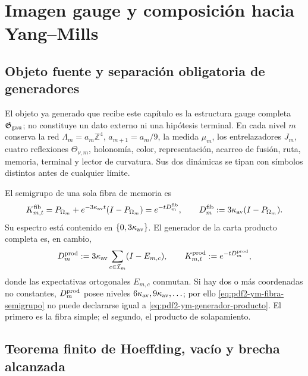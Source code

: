 \chapter{Imagen gauge y composición hacia Yang--Mills}

\section{Objeto fuente y separación obligatoria de generadores}

El objeto ya generado que recibe este capítulo es la estructura gauge completa
$\mathfrak G_{\rm gau}$; no constituye un dato externo ni una hipótesis terminal.
En cada nivel $m$ conserva la red
$\Lambda_m=a_m\mathbb Z^4$, $a_{m+1}=a_m/9$, la medida $\mu_m$, los
entrelazadores $J_m$, cuatro reflexiones $\Theta_{\nu,m}$, holonomía, color,
representación, acarreo de fusión, ruta, memoria, terminal y lector de curvatura.
Sus dos dinámicas se tipan con símbolos distintos antes de cualquier límite.

El semigrupo de una sola fibra de memoria es
\begin{equation}\label{eq:pdf2-ym-fibra-semigrupo}
 K^{\rm fib}_{m,t}
 =P_{\Omega_m}+e^{-3\kappa_{\rm av}t}(I-P_{\Omega_m})
 =e^{-tD_m^{\rm fib}},
 \qquad
 D_m^{\rm fib}:=3\kappa_{\rm av}(I-P_{\Omega_m}).
\end{equation}
Su espectro está contenido en $\{0,3\kappa_{\rm av}\}$. El generador de la
carta producto completa es, en cambio,
\begin{equation}\label{eq:pdf2-ym-generador-producto}
 D_m^{\rm prod}:=3\kappa_{\rm av}
 \sum_{c\in\mathcal I_m}(I-E_{m,c}),
 \qquad
 K^{\rm prod}_{m,t}:=e^{-tD_m^{\rm prod}},
\end{equation}
donde las expectativas ortogonales $E_{m,c}$ conmutan. Si hay dos o más
coordenadas no constantes, $D_m^{\rm prod}$ posee niveles
$6\kappa_{\rm av},9\kappa_{\rm av},\ldots$; por ello
\eqref{eq:pdf2-ym-fibra-semigrupo} no puede declararse igual a
\eqref{eq:pdf2-ym-generador-producto}. El primero es la fibra simple; el segundo,
el producto de solapamiento.

\section{Teorema finito de Hoeffding, vacío y brecha alcanzada}

